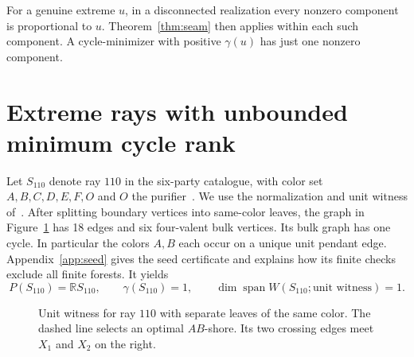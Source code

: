 \documentclass[11pt]{article}
\newcommand{\ray}{S_{110}}
\begin{document}
For a genuine extreme \(u\), in a disconnected realization every
nonzero component is proportional to \(u\). Theorem~\ref{thm:seam}
then applies within each such component. A cycle-minimizer with positive
\(\gamma(u)\) has just one nonzero component.

\section{Extreme rays with unbounded minimum cycle rank}
\label{sec:family}

Let \(\ray\) denote ray \(110\) in the six-party catalogue, with color
set \(A,B,C,D,E,F,O\) and \(O\) the purifier~\cite{hhr2025}. We use the
normalization and unit witness of~\cite{fletcher}. After splitting
boundary vertices into same-color leaves, the graph in
Figure~\ref{fig:ray110} has 18 edges and six four-valent bulk vertices.
Its bulk graph has one cycle. In particular the colors \(A,B\) each
occur on a unique unit pendant edge. Appendix~\ref{app:seed} gives the
seed certificate and explains how its finite checks exclude all finite
forests. It yields
\[
 P(\ray)=\mathbb R\ray,\qquad
 \gamma(\ray)=1,\qquad
 \dim\operatorname{span} W(\ray;\text{unit witness})=1.
\]

\begin{figure}[!htbp]
\centering
{}
\caption{Unit witness for ray \(110\) with separate leaves of the same
color. The dashed line selects an optimal \(AB\)-shore. Its two
crossing edges meet \(X_1\) and \(X_2\) on the right.}
\label{fig:ray110}
\end{figure}
\end{document}
